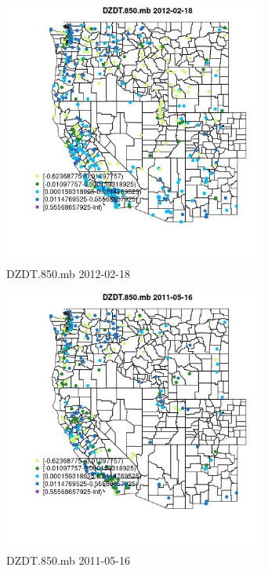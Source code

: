 \begin{figure} 
\centering  
\includegraphics[width=0.77\textwidth]{Code_Outputs/Report_ML_input_PM25_Step4_part_f_de_duplicated_aveswNAs_MapObsDZDT850mb2012-02-18.jpg} 
\caption{\label{fig:Report_ML_input_PM25_Step4_part_f_de_duplicated_aveswNAsMapObsDZDT850mb2012-02-18}DZDT.850.mb 2012-02-18} 
\end{figure} 
 

\clearpage 

\begin{figure} 
\centering  
\includegraphics[width=0.77\textwidth]{Code_Outputs/Report_ML_input_PM25_Step4_part_f_de_duplicated_aveswNAs_MapObsDZDT850mb2011-05-16.jpg} 
\caption{\label{fig:Report_ML_input_PM25_Step4_part_f_de_duplicated_aveswNAsMapObsDZDT850mb2011-05-16}DZDT.850.mb 2011-05-16} 
\end{figure} 
 

